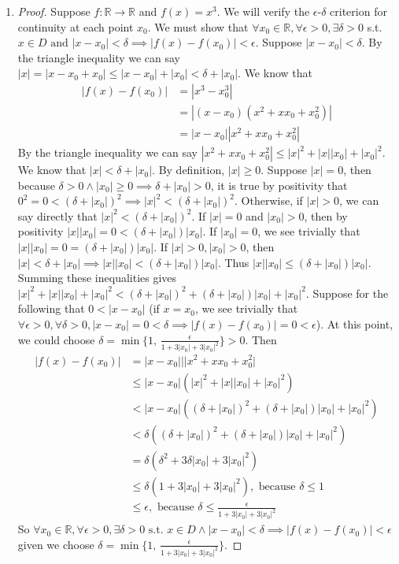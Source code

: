 \documentclass{article}
\begin{document}
\begin{enumerate}
    \item {}
      \begin{proof}
      Suppose $f:\mathbb{R}\to\mathbb{R}$ and $f(x) = x^3$. We will verify the $\epsilon$-$\delta$ criterion
      for continuity at each point $x_0$. We must show that 
      $\forall x_0\in\mathbb{R}, \forall \epsilon > 0, \exists \delta > 0$ s.t.
      $x\in D \text{ and }|x-x_0| < \delta \implies |f(x) - f(x_0)| < \epsilon$.
      Suppose $|x-x_0|<\delta$.
      By the triangle inequality we can say $|x| = |x - x_0 + x_0| \leq |x-x_0| + |x_0| < \delta + |x_0|$.
      We know that 
      \begin{align*}
        |f(x)-f(x_0)| &= |x^3-x_0^3|\\
        &= |(x-x_0)(x^2+xx_0+x_0^2)|\\
        &= |x-x_0||x^2+xx_0+x_0^2|
      \end{align*}
      By the triangle inequality we can say $|x^2 + xx_0 + x_0^2| \leq |x|^2 + |x||x_0| + |x_0|^2$.
      We know that $|x|<\delta + |x_0|$. By definition, $|x| \geq 0$. Suppose 
      $|x| = 0$, then because $\delta > 0 \land |x_0| \geq 0\implies 
      \delta + |x_0| > 0$, it is true by positivity that $0^2 = 0 < (\delta + |x_0|)^2\implies |x|^2 <
      (\delta + |x_0|)^2$.
      Otherwise, if $|x| > 0$, we can say directly that $|x|^2 < (\delta + |x_0|)^2$.
      If $|x| = 0$ and $|x_0| > 0$, then by positivity $|x||x_0| = 0 < (\delta + |x_0|)|x_0|$.
      If $|x_0| = 0$, we see trivially that $|x||x_0| = 0 = (\delta + |x_0|)|x_0|$.
      If $|x| > 0, |x_0| > 0$, then $|x| < \delta + |x_0| \implies |x||x_0| < (\delta + |x_0|)|x_0|$.
      Thus $|x||x_0| \leq (\delta + |x_0|)|x_0|$.
      Summing these inequalities gives $|x|^2 + |x||x_0| + |x_0|^2 < (\delta + |x_0|)^2 + (\delta + |x_0|)|x_0|
      + |x_0|^2$. 
      Suppose for the following that $0 < |x-x_0|$ (if $x = x_0$, we see trivially that 
      $\forall \epsilon > 0, \forall \delta > 0, |x - x_0| = 0 < \delta \implies |f(x) - f(x_0)| = 0 < \epsilon$).
      At this point, we could choose $\delta = \min\{1,\,\frac{\epsilon}{1+3|x_0|+3|x_0|^2}\}>0$. Then
      \begin{align*}
        |f(x)-f(x_0)| &= |x-x_0|||x^2+xx_0+x_0^2|\\
        &\leq |x-x_0|(|x|^2 + |x||x_0| + |x_0|^2)\\
        &< |x-x_0|((\delta + |x_0|)^2 + (\delta + |x_0|)|x_0| + |x_0|^2)\\
        &< \delta((\delta + |x_0|)^2 + (\delta + |x_0|)|x_0| + |x_0|^2)\\
        &= \delta(\delta^2 + 3\delta|x_0| + 3|x_0|^2)\\
        &\leq \delta(1 + 3|x_0| + 3|x_0|^2), \text{ because $\delta \leq 1$}\\
        &\leq \epsilon, \text{ because $\delta \leq \frac{\epsilon}{1+3|x_0|+3|x_0|^2}$}
      \end{align*}
      So $\forall x_0 \in \mathbb{R}, \forall \epsilon > 0, \exists \delta > 0 
      \text{ s.t. } x\in D \land |x - x_0| < \delta \implies |f(x) - f(x_0)| < \epsilon$
      given we choose $\delta = \min\{1,\,\frac{\epsilon}{1+3|x_0|+3|x_0|^2}\}$.
      \end{proof}


\end{enumerate}
\end{document}
